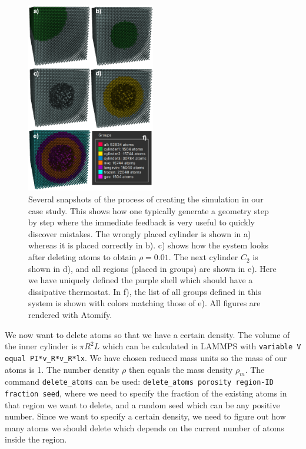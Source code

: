 \documentclass[aps,pre,twocolumn,letterpaper,floatfix,nofootinbib]{revtex4}
\newcommand{\code}[1]{\colorbox{light-gray}{\color{RawSienna}\texttt{#1}}}
\begin{document}
\begin{figure}
	\centering
	\includegraphics[width=0.5\textwidth]{figures/initial_configuration.pdf}
	\caption{
		Several snapshots of the process of creating the simulation in our case study.
		This shows how one typically generate a geometry step by step where the immediate
		feedback is very useful to quickly discover mistakes.
		The wrongly placed cylinder is shown in a) whereas it is placed correctly in b).
		c) shows how the system looks after deleting atoms to obtain $\rho = 0.01$. The next cylinder $C_2$ is shown in d),
		and all regions (placed in groups) are shown in e). Here we have uniquely defined the purple shell which should have a dissipative thermostat.
		In f), the list of all groups defined in this system is shown with colors matching those of e). All figures are rendered with Atomify.
    }
	\label{fig:initial_configuration}
\end{figure}
We now want to delete atoms so that we have a certain density. The volume of the inner cylinder is $\pi R^2 L$ which can be calculated in LAMMPS with \code{variable V equal PI*v\_R*v\_R*lx}.
We have chosen reduced mass units so the mass of our atoms is 1. The number density $\rho$ then equals the mass density $\rho_m$.
The command \code{delete\_atoms} can be used: \code{delete\_atoms porosity region-ID fraction seed}, where we need to specify the fraction of the existing atoms in that region we want to delete, and a random seed which can be any positive number.
Since we want to specify a certain density, we need to figure out how many atoms we should delete which depends on the current number of atoms inside the region.
\end{document}
